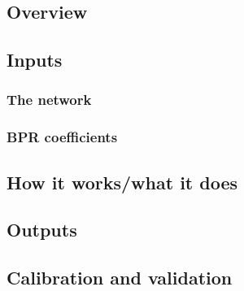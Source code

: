 \subsection{Overview}
\subsection{Inputs}
\subsubsection{The network}
\subsubsection{BPR coefficients}
\subsection{How it works/what it does}
\subsection{Outputs}
\subsection{Calibration and validation}